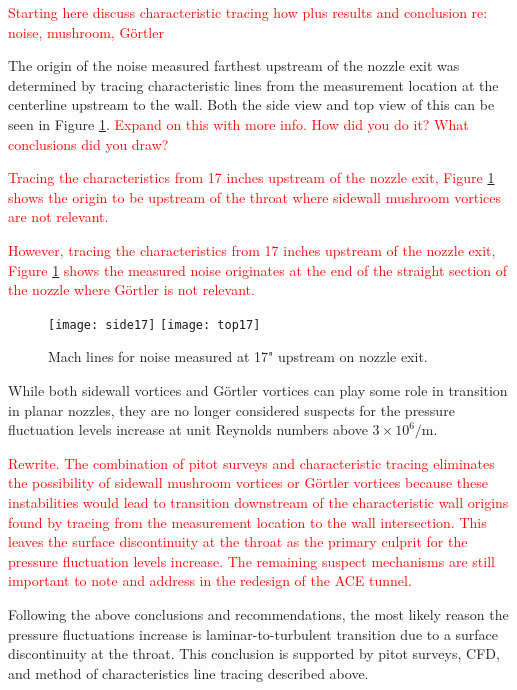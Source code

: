 \textcolor{red}{Starting here discuss characteristic tracing how plus results and conclusion re: noise, mushroom, Görtler}

The origin of the noise measured farthest upstream of the nozzle exit was determined by tracing characteristic lines from the measurement location at the centerline upstream to the wall. Both the side view and top view of this can be seen in Figure \ref{fig:machlines}. \textcolor{red}{Expand on this with more info. How did you do it? What conclusions did you draw?}

\textcolor{red}{Tracing the characteristics from 17 inches upstream of the nozzle exit, Figure \ref{fig:machlines} shows the origin to be upstream of the throat where sidewall mushroom vortices are not relevant.}

\textcolor{red}{However, tracing the characteristics from 17 inches upstream of the nozzle exit, Figure \ref{fig:machlines} shows the measured noise originates at the end of the straight section of the nozzle where Görtler is not relevant.}

\begin{figure}[ht!]
    \centering
    \texttt{[image: side17]}
    \texttt{[image: top17]}
    \caption{Mach lines for noise measured at 17" upstream on nozzle exit.}
    \label{fig:machlines}
\end{figure}

While both sidewall vortices and Görtler vortices can play some role in transition in planar nozzles, they are no longer considered suspects for the pressure fluctuation levels increase at unit Reynolds numbers above $3 \times 10^6/\mathrm{m}$.

\textcolor{red}{Rewrite. The combination of pitot surveys and characteristic tracing eliminates the possibility of sidewall mushroom vortices or Görtler vortices because these instabilities would lead to transition downstream of the characteristic wall origins found by tracing from the measurement location to the wall intersection. This leaves the surface discontinuity at the throat as the primary culprit for the pressure fluctuation levels increase. The remaining suspect mechanisms are still important to note and address in the redesign of the ACE tunnel.}

Following the above conclusions and recommendations, the most likely reason the pressure fluctuations increase is laminar-to-turbulent transition due to a surface discontinuity at the throat. This conclusion is supported by pitot surveys, CFD, and method of characteristics line tracing described above. 

